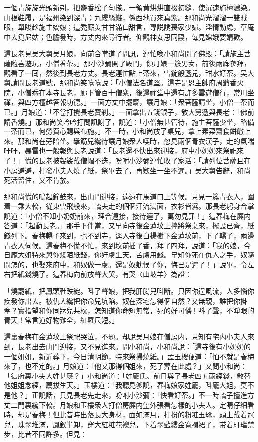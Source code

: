 \begin{myquote}
一個青旋旋光頭新剃，把麝香松子匀搽。一領黄烘烘直裰初縫，使沉速旃檀濃染。山根鞋履，是福州染到深青；九縷絲縧，係西地買來真紫。那和尚光溜溜一雙賊眼，單睃趁施主嬌娘；這秃廝羙甘甘滿口甜言，專説誘喪家少婦。淫情動䖏，草庵中去覓尼姑；色膽發時，方丈内來尋行者。仰觀神女思同寢，每見嫦娥要媾歡。
\end{myquote}

這長老見吴大舅吴月娘，向前合掌道了問訊，連忙喚小和尚開了佛殿：「請施主菩薩隨喜遊玩，小僧看茶。」那小沙彌開了殿門，領月娘一簇男女，前後兩廊參拜，觀看了一囘，然後到長老方丈。長老連忙點上茶來，雪錠般盞兒，甜水好茶。吴大舅請問長老道號，那和尚笑嘻嘻說：「小僧法名道堅。這寺是恩主帥府周爺香火院，小僧忝在本寺長老，廊下管百十僧衆，後邊禪堂中還有許多雲遊僧行，常川坐禪，與四方檀越答報功德。」一面方丈中擺齋，讓月娘：「衆菩薩請坐，小僧一茶而已。」月娘道：「不當打攪長老寳刹。」一面拿出五錢銀子，敎大舅遞與長老：「佛前請香燒。」那和尚笑吟吟打問訊謝了，說道：「小僧無甚管待，施主菩薩少坐，略備一茶而已，何勞費心賜與布施。」不一時，小和尚放了桌兒，拿上素菜齋食餅饊上來。那和尚在旁陪坐。擧筯兒纔待讓月娘衆人喫時，忽見兩個青衣漢子，走的氣喘吁吁，暴雷也一般報與長老說道：「長老還不快出來迎接，府中小奶奶來祭祀來了！」慌的長老披袈裟戴僧帽不迭，吩咐小沙彌連忙收了家活：「請列位菩薩且在小房避避，打發小夫人燒了紙，祭畢去了，再欵坐一坐不遲。」吴大舅告辭，和尚死活留住，又不肯放。

那和尚慌的鳴起鐘鼓來，出山門迎接，遠遠在馬道口上等候。只見一簇青衣人，圍着一乘大轎，従東雲飛般來，轎夫走的個個汗流滿面，衣衫皆濕。那長老躬身合掌說道：「小僧不知小奶奶前來，理合遠接，接待遲了，萬勿見罪！」這春梅在簾内答道：「起動長老。」那手下伴當，又早向寺後金蓮坟上擡將祭桌來，擺設已齊，紙錢列下。春梅轎子來到，也不到寺，逕入寺後白楊樹下金蓮坟前，下了轎子，兩邊青衣人伺候。這春梅不慌不忙，來到坟前插了香，拜了四拜，說道：「我的娘，今日龐大姐特來與你燒陌紙錢，你好䖏生天，苦䖏用錢。早知你死在仇人之手，奴隨問怎的，也娶來府中，和奴做一䖏。還是奴躭悮了你，悔已是遲了！」說畢，令左右把紙錢燒了。這春梅向前放聲大哭，有哭〈山坡羊〉為證：

\begin{myquote}
「燒罷紙，把鳳頭鞋跌綻。呌了聲娘，把我肝腸兒呌斷。只因你逞風流，人多惱你疾發你出去。被仇人纔把你命兒坑陷。奴在深宅怎得個自然？又無親，誰把你掛牽？實指望和你同牀兒共枕，怎知道你命短無常，死的好可憐！呌了聲，不睜眼的青天！常言道好物難全，紅羅尺短。」
\end{myquote}

這裏春梅在金蓮坟上祭祀哭泣，不題。却說吴月娘在僧房内，只知有宅内小夫人來到，長老出去山門迎接，又不見進來。問小和尚，小和尚說：「這寺後有小奶奶的一個姐姐，新近葬下，今日清明節，特來祭掃燒紙。」孟玉樓便道：「怕不就是春梅來了，也不定的。」月娘道：「他又那得個姐來，死了葬在此處？」又問小和尚：「這府裏小夫人姓甚麽？」小和尚道：「姓龐氏。前日與了長老四五兩經錢，敎替他姐姐念經，薦拔生天。」玉樓道：「我聽見爹說，春梅娘家姓龐，呌龐大姐，莫不是他？」正說話，只見長老先走來，吩咐小沙彌：「快看好茶。」不一時轎子擡進方丈二門裏纔下轎。月娘和玉樓衆人打僧房簾内望外張看怎樣的小夫人。定睛仔細看時，却是春梅！但比昔時出落長大身材，面如滿月，打扮的粉粧玉琢，頭上戴着冠兒，珠翠堆滿，鳳釵半卸，穿大紅粧花襖兒，下着翠藍縷金寬襴裙子，带着玎璫禁步，比昔不同許多。但見：

